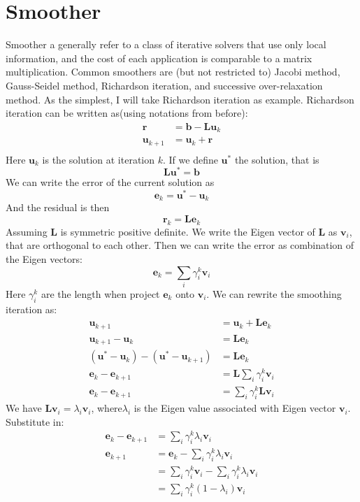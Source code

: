 \section{Smoother}
Smoother a generally refer to a class of iterative solvers that use only local information, and the cost of each application is comparable to a matrix multiplication. Common smoothers are (but not restricted to) Jacobi method, Gauss-Seidel method, Richardson iteration, and successive over-relaxation method. As the simplest, I will take Richardson iteration as example. Richardson iteration can be written as(using notations from before):
\begin{align*}
\mathbf{r} &= \mathbf{b} - \mathbf{L}\mathbf{u}_k \\
\mathbf{u}_{k+1} &= \mathbf{u}_k + \mathbf{r} \\
\end{align*}
Here $\mathbf{u}_k$ is the solution at iteration $k$. If we define $\mathbf{u}^*$ the solution, that is
$$
\mathbf{L}\mathbf{u}^* = \mathbf{b}
$$
We can write the error of the current solution  as
$$
\mathbf{e}_k = \mathbf{u}^* - \mathbf{u}_k 
$$
And the residual is then
$$
\mathbf{r}_k = \mathbf{L}\mathbf{e}_k
$$
Assuming $\mathbf{L}$ is symmetric positive definite. We write the Eigen vector of $\mathbf{L}$ as $\mathbf{v}_i$, that are orthogonal to each other. Then we can write the error as combination of the Eigen vectors:
$$
\mathbf{e}_k = \sum_i \gamma^k_i\mathbf{v}_i
$$
Here $\gamma^k_i$ are the length when project $\mathbf{e}_k$ onto $\mathbf{v}_i$. We can rewrite the smoothing iteration as:
 \begin{align*}
\mathbf{u}_{k+1} &= \mathbf{u}_k + \mathbf{L}\mathbf{e}_k \\
\mathbf{u}_{k+1} - \mathbf{u}_k &= \mathbf{L}\mathbf{e}_k \\
(\mathbf{u}^* - \mathbf{u}_{k}) - (\mathbf{u}^* - \mathbf{u}_{k + 1}) &= \mathbf{L}\mathbf{e}_k\\
\mathbf{e}_{k} -  \mathbf{e}_{k + 1} &= \mathbf{L}\sum_i \gamma^k_i\mathbf{v}_i\\
\mathbf{e}_{k} -  \mathbf{e}_{k + 1} &= \sum_i \gamma^k_i\mathbf{L}\mathbf{v}_i
\end{align*}
We have $\mathbf{L}\mathbf{v}_i = \lambda_i\mathbf{v}_i$, where$\lambda_i$ is the Eigen value associated with Eigen vector $\mathbf{v}_i$. Substitute in:
 \begin{align*}
 \mathbf{e}_{k}  -  \mathbf{e}_{k + 1} &= \sum_i \gamma^k_i \lambda_i\mathbf{v}_i\\
 \mathbf{e}_{k + 1} &=  \mathbf{e}_{k} - \sum_i \gamma^k_i \lambda_i\mathbf{v}_i\\
  &= \sum_i \gamma^k_i\mathbf{v}_i - \sum_i \gamma^k_i\lambda_i\mathbf{v}_i \\
  &= \sum_i \gamma^k_i(1-\lambda_i)\mathbf{v}_i \\
 \end{align*}
